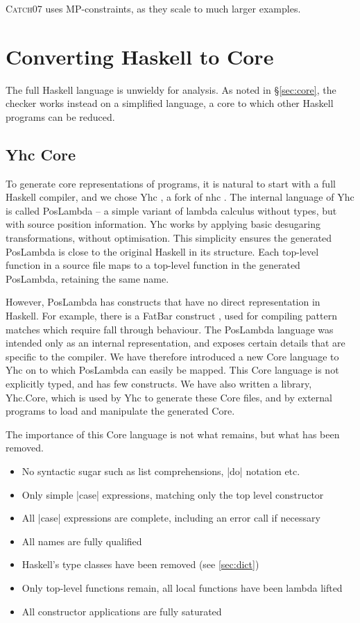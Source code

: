 \documentclass[preprint]{sigplanconf}
\let\cite=\citep
\newcommand{\C}[1]{\textsf{#1}}
\newcommand{\catch}{\textsc{Catch}}
\begin{document}
\catch07 uses MP-constraints, as they scale to much larger examples.

\section{Converting Haskell to Core}
\label{sec:transform}

The full Haskell language is unwieldy for analysis. As noted in \S\ref{sec:core}, the checker works instead on a simplified language, a core to which other Haskell programs can be reduced.

\subsection{Yhc Core}

To generate core representations of programs, it is natural to start with a full Haskell compiler, and we chose Yhc \citep{Yhc}, a fork of nhc \citep{nhc}. The internal language of Yhc is called PosLambda -- a simple variant of lambda calculus without types, but with source position information. Yhc works by applying basic desugaring transformations, without optimisation. This simplicity ensures the generated PosLambda is close to the original Haskell in its structure. Each top-level function in a source file maps to a top-level function in the generated PosLambda, retaining the same name.

However, PosLambda has constructs that have no direct representation in Haskell. For example, there is a FatBar construct \cite{spj:implementation}, used for compiling pattern matches which require fall through behaviour. The PosLambda language was intended only as an internal representation, and exposes certain details that are specific to the compiler. We have therefore introduced a new Core language to Yhc on to which PosLambda can easily be mapped. This Core language is not explicitly typed, and has few constructs. We have also written a library, Yhc.Core, which is used by Yhc to generate these Core files, and by external programs to load and manipulate the generated Core.

The importance of this Core language is not what remains, but what has been removed.

\begin{itemize}
\item No syntactic sugar such as list comprehensions, |do| notation etc.
\item Only simple |case| expressions, matching only the top level constructor
\item All |case| expressions are complete, including an \C{error} call if necessary
\item All names are fully qualified
\item Haskell's type classes have been removed (see \ref{sec:dict})
\item Only top-level functions remain, all local functions have been lambda lifted
\item All constructor applications are fully saturated
\end{itemize}
\end{document}
